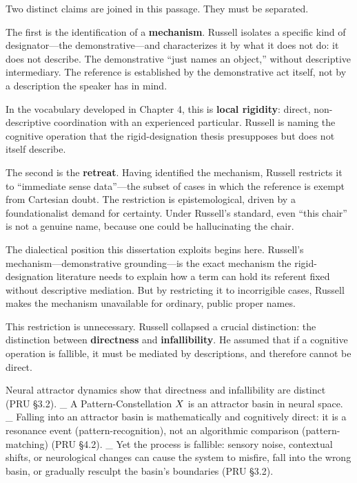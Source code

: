 \documentclass[10pt]{article}
\begin{document}
Two distinct claims are joined in this passage. They must be separated.

The first is the identification of a \textbf{mechanism}. Russell isolates a specific kind of designator---the demonstrative---and characterizes it by what it does not do: it does not describe. The demonstrative ``just names an object,'' without descriptive intermediary. The reference is established by the demonstrative act itself, not by a description the speaker has in mind.

In the vocabulary developed in Chapter 4, this is \textbf{local rigidity}: direct, non-descriptive coordination with an experienced particular. Russell is naming the cognitive operation that the rigid-designation thesis presupposes but does not itself describe.

The second is the \textbf{retreat}. Having identified the mechanism, Russell restricts it to ``immediate sense data''---the subset of cases in which the reference is exempt from Cartesian doubt. The restriction is epistemological, driven by a foundationalist demand for certainty. Under Russell's standard, even ``this chair'' is not a genuine name, because one could be hallucinating the chair.

The dialectical position this dissertation exploits begins here. Russell's mechanism---demonstrative grounding---is the exact mechanism the rigid-designation literature needs to explain how a term can hold its referent fixed without descriptive mediation. But by restricting it to incorrigible cases, Russell makes the mechanism unavailable for ordinary, public proper names.

This restriction is unnecessary. Russell collapsed a crucial distinction: the distinction between \textbf{directness} and \textbf{infallibility}. He assumed that if a cognitive operation is fallible, it must be mediated by descriptions, and therefore cannot be direct.

Neural attractor dynamics show that directness and infallibility are distinct (PRU §3.2). \_ A Pattern-Constellation \(\\{X\\}\) is an attractor basin in neural space. \_ Falling into an attractor basin is mathematically and cognitively direct: it is a resonance event (pattern-recognition), not an algorithmic comparison (pattern-matching) (PRU §4.2). \_ Yet the process is fallible: sensory noise, contextual shifts, or neurological changes can cause the system to misfire, fall into the wrong basin, or gradually resculpt the basin's boundaries (PRU §3.2).
\end{document}
